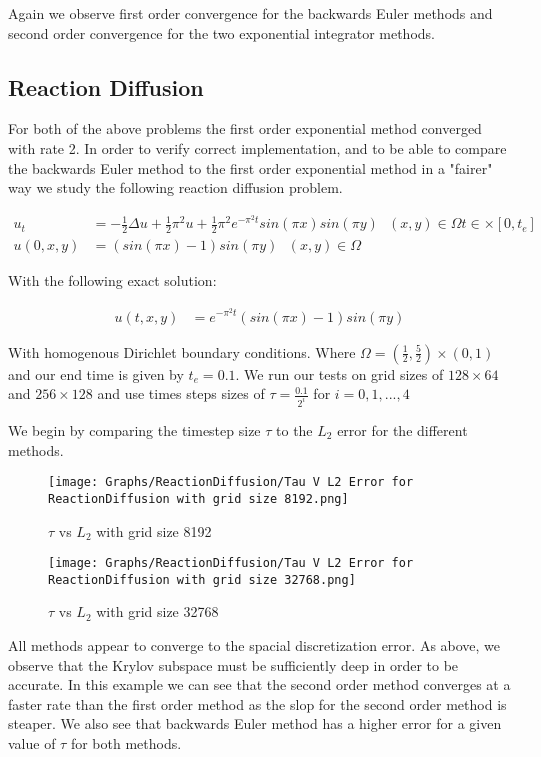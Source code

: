 Again we observe first order convergence for the backwards Euler methods and second order convergence for the two exponential integrator methods.

\subsection{Reaction Diffusion}

For both of the above problems the first order exponential method converged with rate 2.
In order to verify correct implementation, and to be able to compare the backwards Euler method to the first order exponential method in a "fairer" way we study the following reaction diffusion problem\cite{Huang2022}.

\begin{align*}
    u_t &= -\frac12\Delta u + \frac12 \pi^2u + \frac12 \pi^2 e^{-\pi^2t}sin(\pi x)sin(\pi y) \text{ } (x,y)\in\Omega t\in\times[0,t_e]\\
    u(0,x,y) &= (sin(\pi x) - 1)sin(\pi y) \text{ } (x,y)\in \Omega
\end{align*}

With the following exact solution:

\begin{align*}
    u(t, x, y) &= e^{-\pi^2t}(sin(\pi x) - 1)sin(\pi y)
\end{align*}

With homogenous Dirichlet boundary conditions.
Where $\Omega = (\frac12, \frac52)\times(0,1)$ and our end time is given by $t_e = 0.1$.
We run our tests on grid sizes of $128\times64$ and $256\times128$ and use times steps sizes of $\tau=\frac{0.1}{2^i}$ for $i = 0,1,...,4$


We begin by comparing the timestep size $\tau$ to the $L_2$ error for the different methods.
\begin{figure}[H]
    \centering
    \begin{minipage}{0.49\textwidth}
        \texttt{[image: Graphs/ReactionDiffusion/Tau V L2 Error for ReactionDiffusion with grid size 8192.png]} %
        \caption{$\tau$ vs $L_2$ with grid size 8192}
        \label{fig:ACtauE}
    \end{minipage}\hfill
    \centering
    \begin{minipage}{0.49\textwidth}
        \texttt{[image: Graphs/ReactionDiffusion/Tau V L2 Error for ReactionDiffusion with grid size 32768.png]} %
        \caption{$\tau$ vs $L_2$ with grid size 32768}
        \label{fig:ACtauE1024}
    \end{minipage}\hfill
\end{figure}
All methods appear to converge to the spacial discretization error.
As above, we observe that the Krylov subspace must be sufficiently deep in order to be accurate.
In this example we can see that the second order method converges at a faster rate than the first order method as the slop for the second order method is steaper.
We also see that backwards Euler method has a higher error for a given value of $\tau$ for both methods.

